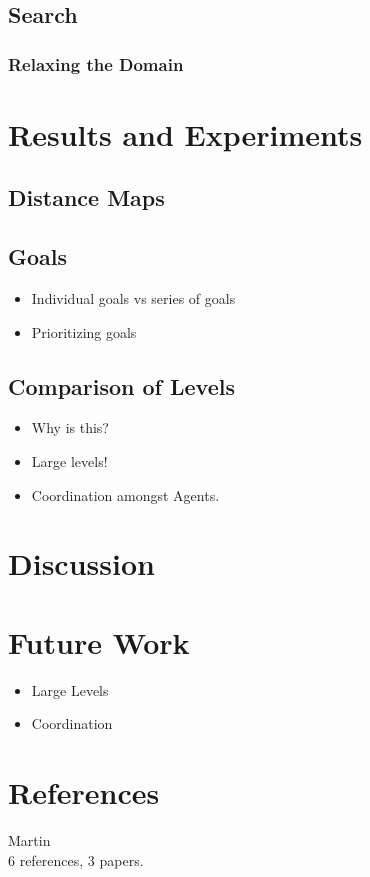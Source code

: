 \documentclass[10pt,a4paper]{article}
\begin{document}
	\subsection{Search}
		\subsubsection{Relaxing the Domain}

\section{Results and Experiments}
	\subsection{Distance Maps}
	\subsection{Goals}
		\begin{itemize}
			\item{Individual goals vs series of goals}
			\item{Prioritizing goals}
		\end{itemize}

	\subsection{Comparison of Levels}
		\begin{itemize}
			\item{Why is this?}
			\item{Large levels!}
			\item{Coordination amongst Agents.}
		\end{itemize}

\section{Discussion}

\section{Future Work}
	\begin{itemize}
		\item{Large Levels}
		\item{Coordination}
	\end{itemize}

\section{References}
	Martin\\
	6 references, 3 papers.
		
		


\end{document}
